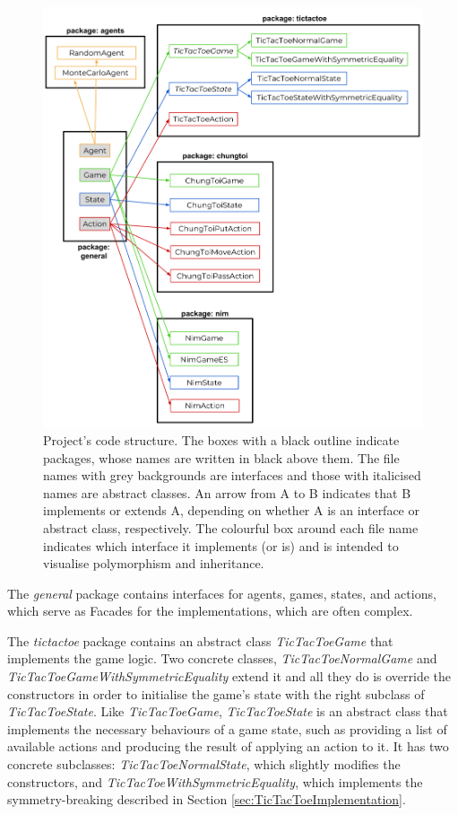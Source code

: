 \documentclass[11pt,a4paper,twoside,openright]{report}
\begin{document}
\begin{figure}[htbp]
	\begin{center}
		\includegraphics[width=\linewidth]{code_structure.png}
		\caption{Project's code structure. The boxes with a black outline indicate packages, whose names are written in black above them. The file names with grey backgrounds are interfaces and those with italicised names are abstract classes. An arrow from A to B indicates that B implements or extends A, depending on whether A is an interface or abstract class, respectively. The colourful box around each file name indicates which interface it implements (or is) and is intended to visualise polymorphism and inheritance.}
		\label{code-structure}
		
	\end{center}
\end{figure}

The \emph{general} package contains interfaces for agents, games, states, and actions, which serve as Facades for the implementations, which are often complex.

The \emph{tictactoe} package contains an abstract class \emph{TicTacToeGame} that implements the game logic. Two concrete classes, \emph{TicTacToeNormalGame} and \emph{TicTacToeGameWithSymmetricEquality} extend it and all they do is override the constructors in order to initialise the game's state with the right subclass of \emph{TicTacToeState}. Like \emph{TicTacToeGame}, \emph{TicTacToeState} is an abstract class that implements the necessary behaviours of a game state, such as providing a list of available actions and producing the result of applying an action to it. It has two concrete subclasses: \emph{TicTacToeNormalState}, which slightly modifies the constructors, and \emph{TicTacToeWithSymmetricEquality}, which implements the symmetry-breaking described in Section \ref{sec:TicTacToeImplementation}.
\end{document}
